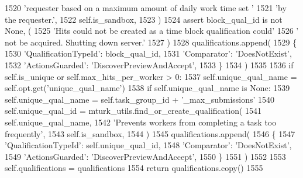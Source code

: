 \begin{DoxyCode}
1520                 \textcolor{stringliteral}{'requester based on a maximum amount of daily work time set '}
1521                 \textcolor{stringliteral}{'by the requester.'},
1522                 self.is\_sandbox,
1523             )
1524             \textcolor{keyword}{assert} block\_qual\_id \textcolor{keywordflow}{is} \textcolor{keywordflow}{not} \textcolor{keywordtype}{None}, (
1525                 \textcolor{stringliteral}{'Hits could not be created as a time block qualification could'}
1526                 \textcolor{stringliteral}{' not be acquired. Shutting down server.'}
1527             )
1528             qualifications.append(
1529                 \{
1530                     \textcolor{stringliteral}{'QualificationTypeId'}: block\_qual\_id,
1531                     \textcolor{stringliteral}{'Comparator'}: \textcolor{stringliteral}{'DoesNotExist'},
1532                     \textcolor{stringliteral}{'ActionsGuarded'}: \textcolor{stringliteral}{'DiscoverPreviewAndAccept'},
1533                 \}
1534             )
1535 
1536         \textcolor{keywordflow}{if} self.is\_unique \textcolor{keywordflow}{or} self.max\_hits\_per\_worker > 0:
1537             self.unique\_qual\_name = self.opt.get(\textcolor{stringliteral}{'unique\_qual\_name'})
1538             \textcolor{keywordflow}{if} self.unique\_qual\_name \textcolor{keywordflow}{is} \textcolor{keywordtype}{None}:
1539                 self.unique\_qual\_name = self.task\_group\_id + \textcolor{stringliteral}{'\_max\_submissions'}
1540             self.unique\_qual\_id = mturk\_utils.find\_or\_create\_qualification(
1541                 self.unique\_qual\_name,
1542                 \textcolor{stringliteral}{'Prevents workers from completing a task too frequently'},
1543                 self.is\_sandbox,
1544             )
1545             qualifications.append(
1546                 \{
1547                     \textcolor{stringliteral}{'QualificationTypeId'}: self.unique\_qual\_id,
1548                     \textcolor{stringliteral}{'Comparator'}: \textcolor{stringliteral}{'DoesNotExist'},
1549                     \textcolor{stringliteral}{'ActionsGuarded'}: \textcolor{stringliteral}{'DiscoverPreviewAndAccept'},
1550                 \}
1551             )
1552 
1553         self.qualifications = qualifications
1554         \textcolor{keywordflow}{return} qualifications.copy()
1555 
\end{DoxyCode}
\mbox{\label{classparlai_1_1mturk_1_1core_1_1dev_1_1mturk__manager_1_1MTurkManager_a20e66905d846c6551ab65c328e084d11}} 
